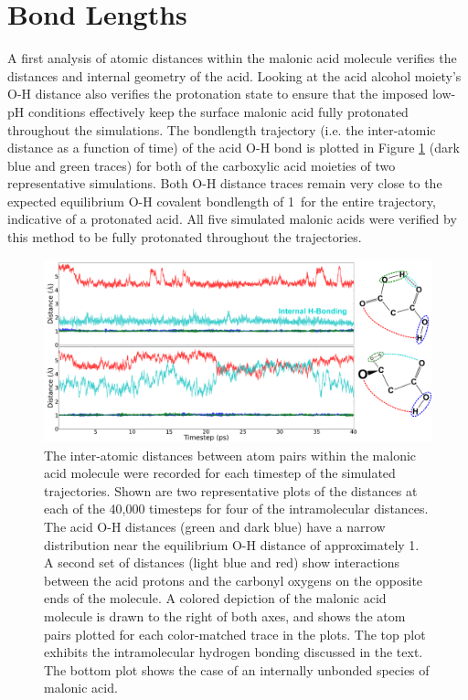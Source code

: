 \section{Bond Lengths}

A first analysis of atomic distances within the malonic acid molecule verifies the distances and internal geometry of the acid. Looking at the acid alcohol moiety's O-H distance also verifies the protonation state to ensure that the imposed low-pH conditions effectively keep the surface malonic acid fully protonated throughout the simulations. The bondlength trajectory (i.e. the inter-atomic distance as a function of time) of the acid O-H bond is plotted in Figure \ref{fig:bondlength-trajectory} (dark blue and green traces) for both of the carboxylic acid moieties of two representative simulations. Both O-H distance traces remain very close to the expected equilibrium O-H covalent bondlength of 1\angs~for the entire trajectory, indicative of a protonated acid. All five simulated malonic acids were verified by this method to be fully protonated throughout the trajectories.

\begin{figure}[h!]
	\begin{center}
		\includegraphics[scale=1.0]{images/bond-length/bondlengths.png}
		\caption{The inter-atomic distances between atom pairs within the malonic acid molecule were recorded for each timestep of the simulated trajectories. Shown are two representative plots of the distances at each of the 40,000 timesteps for four of the intramolecular distances. The acid O-H distances (green and dark blue) have a narrow distribution near the equilibrium O-H distance of approximately 1\angs. A second set of distances (light blue and red) show interactions between the acid protons and the carbonyl oxygens on the opposite ends of the molecule. A colored depiction of the malonic acid molecule is drawn to the right of both axes, and shows the atom pairs plotted for each color-matched trace in the plots. The top plot exhibits the intramolecular hydrogen bonding discussed in the text. The bottom plot shows the case of an internally unbonded species of malonic acid.}
		\label{fig:bondlength-trajectory}
	\end{center}
\end{figure}


